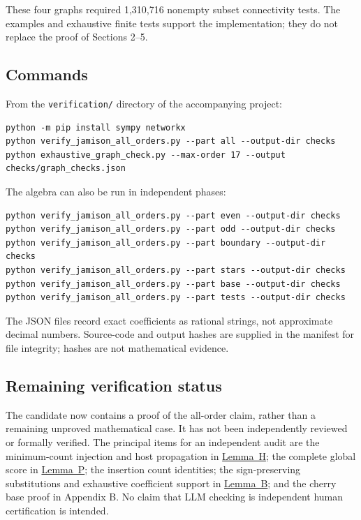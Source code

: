 \documentclass[11pt,letterpaper]{article}
\theoremstyle{plain}
\begin{document}
These four graphs required 1,310,716 nonempty subset connectivity tests. The examples and exhaustive finite tests support the implementation; they do not replace the proof of Sections 2--5.

\subsection*{Commands}\label{commands}

From the \texttt{verification/} directory of the accompanying project:

\begin{Verbatim}[breaklines=true,breakanywhere=true,fontsize=\small]
python -m pip install sympy networkx
python verify_jamison_all_orders.py --part all --output-dir checks
python exhaustive_graph_check.py --max-order 17 --output checks/graph_checks.json
\end{Verbatim}

The algebra can also be run in independent phases:

\begin{Verbatim}[breaklines=true,breakanywhere=true,fontsize=\small]
python verify_jamison_all_orders.py --part even --output-dir checks
python verify_jamison_all_orders.py --part odd --output-dir checks
python verify_jamison_all_orders.py --part boundary --output-dir checks
python verify_jamison_all_orders.py --part stars --output-dir checks
python verify_jamison_all_orders.py --part base --output-dir checks
python verify_jamison_all_orders.py --part tests --output-dir checks
\end{Verbatim}

The JSON files record exact coefficients as rational strings, not approximate decimal numbers. Source-code and output hashes are supplied in the manifest for file integrity; hashes are not mathematical evidence.

\subsection*{Remaining verification status}\label{remaining-verification-status}

The candidate now contains a proof of the all-order claim, rather than a remaining unproved mathematical case. It has not been independently reviewed or formally verified. The principal items for an independent audit are the minimum-count injection and host propagation in \hyperref[lem:host]{Lemma~H}; the complete global score in \hyperref[lem:packet]{Lemma~P}; the insertion count identities; the sign-preserving substitutions and exhaustive coefficient support in \hyperref[lem:broom]{Lemma~B}; and the cherry base proof in Appendix B. No claim that LLM checking is independent human certification is intended.
\end{document}

